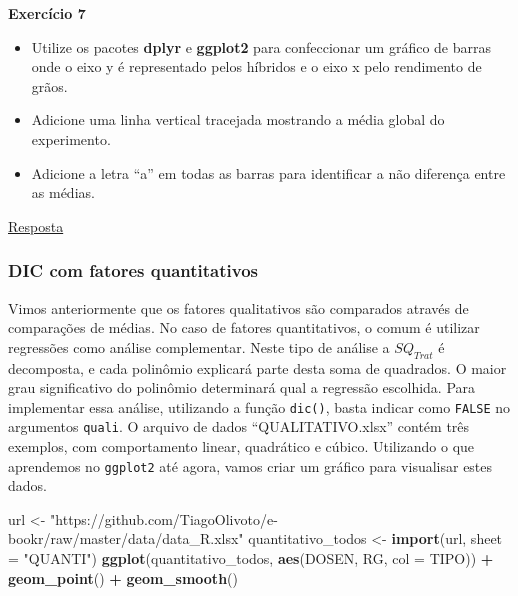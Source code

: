 \documentclass[
]{book}
\newenvironment{Shaded}{\begin{snugshade}}{\end{snugshade}}
\newcommand{\DataTypeTok}[1]{\textcolor[rgb]{0.13,0.29,0.53}{#1}}
\newcommand{\KeywordTok}[1]{\textcolor[rgb]{0.13,0.29,0.53}{\textbf{#1}}}
\newcommand{\NormalTok}[1]{#1}
\newcommand{\OperatorTok}[1]{\textcolor[rgb]{0.81,0.36,0.00}{\textbf{#1}}}
\newcommand{\StringTok}[1]{\textcolor[rgb]{0.31,0.60,0.02}{#1}}
\providecommand{\tightlist}{%
  \setlength{\itemsep}{0pt}\setlength{\parskip}{0pt}}
\begin{document}
\begin{tarefa}
\textbf{Exercício 7}

\begin{itemize}
\tightlist
\item
  Utilize os pacotes \textbf{dplyr} e \textbf{ggplot2} para confeccionar um gráfico de barras onde o eixo y é representado pelos híbridos e o eixo x pelo rendimento de grãos.
\item
  Adicione uma linha vertical tracejada mostrando a média global do experimento.
\item
  Adicione a letra ``a'' em todas as barras para identificar a não diferença entre as médias.
\end{itemize}
\end{tarefa}

\protect\hyperlink{exerc7}{Resposta}

\hypertarget{dic-com-fatores-quantitativos}{%
\subsubsection{DIC com fatores quantitativos}\label{dic-com-fatores-quantitativos}}


Vimos anteriormente que os fatores qualitativos são comparados através de comparações de médias. No caso de fatores quantitativos, o comum é utilizar regressões como análise complementar. Neste tipo de análise a \(SQ_{Trat}\) é decomposta, e cada polinômio explicará parte desta soma de quadrados. O maior grau significativo do polinômio determinará qual a regressão escolhida. Para implementar essa análise, utilizando a função \texttt{dic()}, basta indicar como \texttt{FALSE} no argumentos \texttt{quali}. O arquivo de dados ``QUALITATIVO.xlsx'' contém três exemplos, com comportamento linear, quadrático e cúbico. Utilizando o que aprendemos no \texttt{ggplot2} até agora, vamos criar um gráfico para visualisar estes dados.   

\begin{Shaded}
\begin{Highlighting}[]
\NormalTok{url <-}\StringTok{ "https://github.com/TiagoOlivoto/e-bookr/raw/master/data/data_R.xlsx"}
\NormalTok{quantitativo_todos <-}\StringTok{ }\KeywordTok{import}\NormalTok{(url, }\DataTypeTok{sheet =} \StringTok{"QUANTI"}\NormalTok{)}
\KeywordTok{ggplot}\NormalTok{(quantitativo_todos, }\KeywordTok{aes}\NormalTok{(DOSEN, RG, }\DataTypeTok{col =}\NormalTok{ TIPO)) }\OperatorTok{+}
\StringTok{  }\KeywordTok{geom_point}\NormalTok{() }\OperatorTok{+}
\StringTok{  }\KeywordTok{geom_smooth}\NormalTok{()}
\end{Highlighting}
\end{Shaded}
\end{document}
